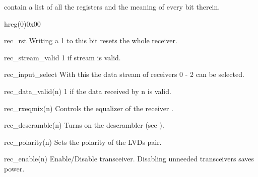\documentclass[11pt,technote,a4paper,onecolumn]{IEEEtran}
\begin{document}
 contain a list of all the registers and the meaning of
every bit therein.
\begin{register}{h}{reg(0)}{0x00}%
    \label{reg0}%
    \regnewline%
    \begin{regdesc}\begin{reglist}
        \item[rec\_rst] Writing a 1 to this bit resets the whole receiver.
        \item[rec\_stream\_valid] 1 if stream is valid.
        \item[rec\_input\_select] With this the data stream of receivers 0 - 2
            can be selected.
        \item[rec\_data\_valid(n)] 1 if the data received by n is valid.
        \item[rec\_rxeqmix(n)] Controls the equalizer of the receiver
            \cite[p. 165f]{gtx}.
        \item[rec\_descramble(n)] Turns on the descrambler (see
            ).
        \item[rec\_polarity(n)] Sets the polarity of the LVDs pair.
        \item[rec\_enable(n)] Enable/Disable transceiver. Disabling unneeded
            transceivers saves power.
    \end{reglist}\end{regdesc}
\end{register}
\end{document}

